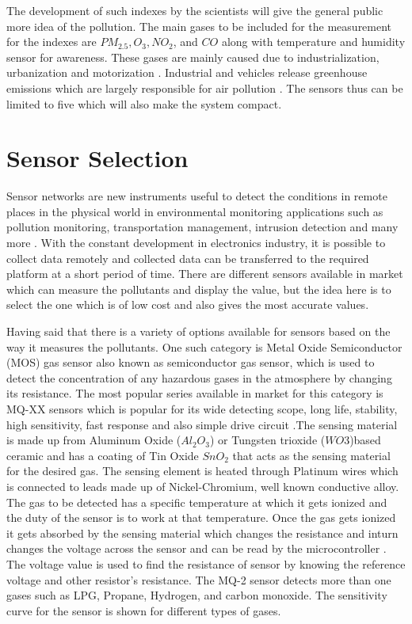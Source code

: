 \documentclass[11pt]{article}
\begin{document}
The development of such indexes by the scientists will give the general public more idea of the pollution. The main gases to be included for the measurement for the indexes are  $PM_{2.5}, O_3, NO_2$, and $CO$ along with temperature and humidity sensor for awareness. These gases are mainly caused due to industrialization, urbanization and motorization \cite{Saha1952}. Industrial and vehicles release greenhouse emissions which are largely responsible for air pollution \cite{ internet}. The sensors thus can be limited to five which will also make the system compact.


   \section*{Sensor Selection} 
    
    Sensor networks are new instruments useful to detect the conditions in remote places in the physical world in environmental monitoring applications such as pollution monitoring, transportation management, intrusion detection and many more \cite{Jung2011}. With the constant development in electronics industry, it is possible to collect data remotely and collected data can be transferred to the required platform at a short period of time.
    There are different sensors available in market which can measure the pollutants and display the value, but the idea here is to select the one which is of low cost and also gives the most accurate values.
    \par
    Having said that there is a variety of options available for sensors based on the way it measures the pollutants. One such category is Metal Oxide Semiconductor (MOS) gas sensor also known as semiconductor gas sensor, which is used to detect the concentration of any hazardous gases in the atmosphere by changing its resistance. The most popular series available in market for this category is MQ-XX sensors which is popular for its wide detecting scope, long life, stability, high sensitivity, fast response and also simple drive circuit \cite{Data2012}.The sensing material is made up from Aluminum Oxide ($ Al_{2}O_{3}$) or Tungsten trioxide ($WO3$)based ceramic and has a coating of Tin Oxide $ SnO_{2} $ that acts as the sensing material for the desired gas. The sensing element is heated through Platinum wires which is connected to leads made up of Nickel-Chromium, well known conductive alloy. The gas to be detected has a specific temperature at which it gets ionized and the duty of the sensor is to work at that temperature. Once the gas gets ionized it gets absorbed by the sensing material which changes the resistance and inturn changes the voltage across the sensor and can be read by the microcontroller \cite{gassensor}. The voltage value is used to find the resistance of sensor by knowing the reference voltage and other resistor's resistance. The MQ-2 sensor detects more than one gases such as LPG, Propane, Hydrogen, and carbon monoxide. The sensitivity curve for the sensor is shown for different types of gases.
\end{document}
